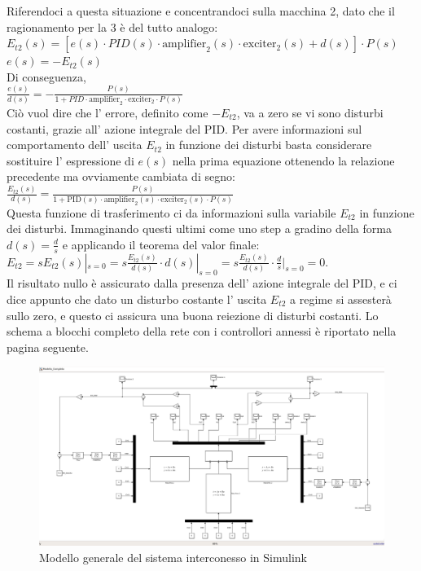 \documentclass[Lau,noexaminfo]{sapthesis}
\begin{document}
	Riferendoci a questa situazione e concentrandoci sulla macchina 2, dato che il ragionamento per la 3 è del tutto analogo:\\
	$E_{t2}(s)=[e(s)\cdot PID(s)\cdot \text{amplifier}_2(s)\cdot \text{exciter}_2(s)+d(s)]\cdot P(s)$\\
	$e(s)=-E_{t2}(s)$\\
	Di conseguenza,\\
	$\frac{e(s)}{d(s)}=-\frac{P(s)}{1+PID\cdot \text{amplifier}_2\cdot \text{exciter}_2\cdot P(s)}$\\
	Ciò vuol dire che l' errore, definito come $-E_{t2}$, va a zero se vi sono disturbi costanti, grazie all' azione integrale del PID. Per avere informazioni sul comportamento dell' uscita $E_{t2}$ in funzione dei disturbi basta considerare sostituire l' espressione di $e(s)$ nella prima equazione ottenendo la relazione precedente ma ovviamente cambiata di segno:\\
	$\frac{E_{t2}(s)}{d(s)}=\frac{P(s)}{1+\text{PID}(s)\cdot \text{amplifier}_2(s)\cdot \text{exciter}_2(s) \cdot P(s)}$\\
	Questa funzione di trasferimento ci da informazioni sulla variabile $E_{t2}$ in funzione dei disturbi. Immaginando questi ultimi come uno step a gradino della forma $d(s)=\frac{d}{s}$ e applicando il teorema del valor finale:\\
	$E_{t2}=sE_{t2}(s)|_{s=0}=s\frac{E_{t2}(s)}{d(s)}\cdot d(s)|_{s=0}=s\frac{E_{t2}(s)}{d(s)}\cdot \frac{d}{s}|_{s=0}=0$.\\
	Il risultato nullo è assicurato dalla presenza dell' azione integrale del PID, e ci dice appunto che dato un disturbo costante l' uscita $E_{t2}$ a regime si assesterà sullo zero, e questo ci assicura una buona reiezione di disturbi costanti. 
	Lo schema a blocchi completo della rete con i controllori annessi è riportato nella pagina seguente.
	\begin{figure}[h]
		\centering
			\includegraphics[scale=0.33,angle=-90]{Modello_controllato}
			\caption{Modello generale del sistema interconesso in Simulink}
	\end{figure}
\end{document}
